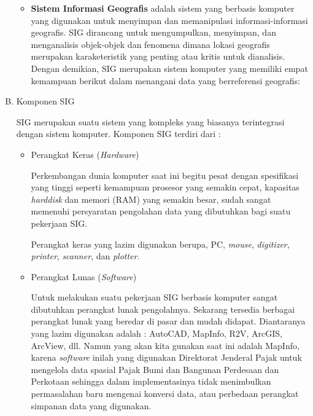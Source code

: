 \begin{enumerate}[A.]
\begin{itemize}
\item \textbf{Sistem Informasi Geografis} adalah sistem yang berbasis komputer yang digunakan untuk menyimpan dan memanipulasi informasi-informasi geografis. SIG dirancang untuk mengumpulkan, menyimpan, dan menganalisis objek-objek dan fenomena dimana lokasi geografis merupakan karaketeristik yang penting atau kritis untuk dianalisis. Dengan demikian, SIG merupakan sistem komputer yang memiliki empat kemampuan berikut dalam menangani data yang berreferensi geografis: 

\end{itemize}

\item{Komponen SIG}

SIG merupakan suatu sistem yang kompleks yang biasanya terintegrasi dengan sistem komputer. Komponen SIG terdiri dari :

\begin{itemize}
\item Perangkat Keras (\textit{Hardware})

Perkembangan dunia komputer saat ini begitu pesat dengan spesifikasi yang tinggi seperti kemampuan prosesor yang semakin cepat, kapasitas \textit{harddisk} dan memori (RAM) yang semakin besar, sudah sangat memenuhi persyaratan pengolahan data yang dibutuhkan bagi suatu pekerjaan SIG.

Perangkat keras yang lazim digunakan berupa, PC, \textit{mouse}, \textit{digitizer}, \textit{printer}, \textit{scanner}, dan \textit{plotter}.

\item Perangkat Lunas (\textit{Software})

Untuk melakukan suatu pekerjaan SIG berbasis komputer sangat dibutuhkan perangkat lunak pengolahnya. Sekarang tersedia berbagai perangkat lunak yang beredar di pasar dan mudah didapat. Diantaranya yang lazim digunakan adalah : AutoCAD, MapInfo, R2V, ArcGIS, ArcView, dll. Namun yang akan kita gunakan saat ini adalah MapInfo, karena \textit{software} inilah yang digunakan Direktorat Jenderal Pajak untuk mengelola data spasial Pajak Bumi dan Bangunan Perdesaan dan Perkotaan sehingga dalam implementasinya tidak menimbulkan permasalahan baru mengenai konversi data, atau perbedaan perangkat simpanan data yang digunakan.


\end{itemize}
\end{enumerate}

